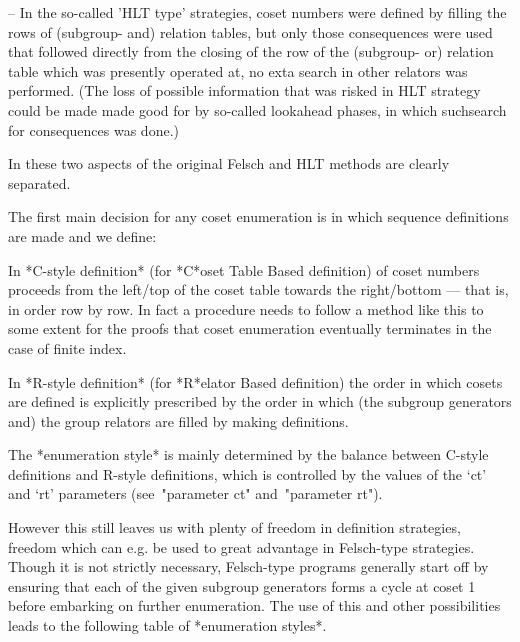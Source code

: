 \item{--} 
In the so-called 'HLT type'  strategies, coset numbers were defined by
filling the  rows of (subgroup-  and) relation tables, but  only those
consequences were used that followed  directly from the closing of the
row of the (subgroup- or)  relation table which was presently operated
at,  no exta search  in other  relators was  performed.  (The  loss of
possible information  that was  risked in HLT  strategy could  be made
made good for  by so-called lookahead phases, in  which suchsearch for
consequences was done.)

\enditems

In {\ACE} these two aspects of the original Felsch and HLT methods are
clearly separated.

The first main decision for any coset enumeration is in which sequence
definitions are made and we define:

In *C-style definition* (for  *C*oset Table Based definition) of coset
numbers  proceeds from  the left/top  of the  coset table  towards the
right/bottom ---  that is, in order  row by row.  In  fact a procedure
needs to follow a method like  this to some extent for the proofs that
coset enumeration eventually terminates in the case of finite index.

In *R-style definition* (for  *R*elator Based definition) the order in
which  cosets are  defined is  explicitly prescribed  by the  order in
which (the subgroup  generators and) the group relators  are filled by
making definitions.

The *enumeration  style* is mainly  determined by the  balance between
C-style definitions  and R-style  definitions, which is  controlled by
the  values  of  the  `ct'  and `rt'  parameters  (see~"parameter  ct"
and~"parameter rt").

However  this still  leaves us  with plenty  of freedom  in definition
strategies,  freedom which  can e.g.   be used  to great  advantage in
Felsch-type   strategies.  Though  it   is  not   strictly  necessary,
Felsch-type programs generally start off  by ensuring that each of the
given subgroup generators forms a cycle at coset 1 before embarking on
further enumeration. The use of  this and other possibilities leads to
the following table of *enumeration styles*.


